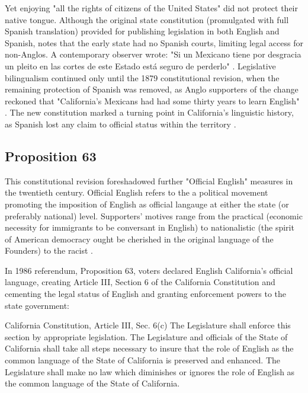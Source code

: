 Yet enjoying "all the rights of citizens of the United States" did not protect
their native tongue. Although the original state constitution (promulgated with
full Spanish translation) provided for publishing legislation in both English
and Spanish, \textcite{lamar-prieto14} notes that the early state had no Spanish
courts, limiting legal access for non-Anglos. A contemporary observer wrote: "Si
un Mexicano tiene por desgracia un pleito en las cortes de este Estado está
seguro de perderlo" \parencite[28]{lamar-prieto14}. Legislative bilingualism
continued only until the 1879 constitutional revision, when the remaining
protection of Spanish was removed, as Anglo supporters of the change reckoned
that "California's Mexicans had had some thirty years to learn English"
\parencite{baron92}. The new constitution marked a turning point in California's
linguistic history, as Spanish lost any claim to official status within the
territory \parencite{baron92}.

\subsection{Proposition 63}

This constitutional revision foreshadowed further "Official English" measures in
the twentieth century. Official English refers to the a political movement
promoting the imposition of English as official langauge at either the state (or
preferably national) level. Supporters' motives range from the practical
(economic necessity for immigrants to be conversant in English) to nationalistic
(the spirit of American democracy ought be cherished in the original language of
the Founders) to the racist \parencite[7]{baron92}.

In 1986 referendum, Proposition 63, voters declared English California's
official language, creating Article III, Section 6 of the California
Constitution and cementing the legal status of English and granting enforcement
powers to the state government: 

\begin{aquote}{California Constitution, Article III, Sec. 6(c)}
	The Legislature shall enforce this section by appropriate legislation. The
	Legislature and officials of the State of California shall take all steps
	necessary to insure that the role of English as the common language of the
	State of California is preserved and enhanced. The Legislature shall make no
	law which diminishes or ignores the role of English as the common language of
	the State of California. \parencite{ca-const}
\end{aquote}

